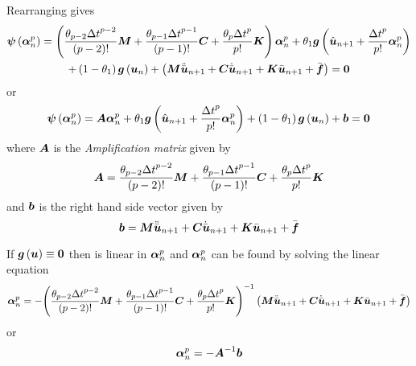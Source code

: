 Rearranging gives
\begin{multline}
  \fnof{\vect{\psi}}{\vect{\alpha}^{p}_{n}}=\pbrac{\dfrac{\theta_{p-2}{\Delta
        t}^{p-2}}{\factorial{p-2}}\matr{M}+\dfrac{\theta_{p-1}{\Delta
        t}^{p-1}}{\factorial{p-1}}\matr{C}+\dfrac{\theta_{p}{\Delta
        t}^{p}}{p!}\matr{K}}\vect{\alpha}^{p}_{n}+\theta_{1}\fnof{\vect{g}}{\hat{\vect{u}}_{n+1}+ 
    \dfrac{{\Delta t}^{p}}{p!}\vect{\alpha}^{p}_{n}} \\
  +\pbrac{1-\theta_{1}}\fnof{\vect{g}}{\vect{u}_{n}}+
  \pbrac{\matr{M}\ddot{\bar{\vect{u}}}_{n+1}+\matr{C}\dot{\bar{\vect{u}}}_{n+1}+\matr{K}\bar{\vect{u}}_{n+1}+
    \bar{\vect{f}}}= \vect{0}
  \label{eqn:dynamic}
\end{multline}
or 
\begin{equation}
\fnof{\vect{\psi}}{\vect{\alpha}^{p}_{n}}=\matr{A}\vect{\alpha}^{p}_{n}+
\theta_{1}\fnof{\vect{g}}{\hat{\vect{u}}_{n+1}+ \dfrac{{\Delta
      t}^{p}}{p!}\vect{\alpha}^{p}_{n}}+\pbrac{1-\theta_{1}}\fnof{\vect{g}}{\vect{u}_{n}}+\vect{b}= \vect{0}
\end{equation}
where $\matr{A}$ is the \emph{Amplification matrix} given by
\begin{equation}
  \matr{A}=\dfrac{\theta_{p-2}{\Delta t}^{p-2}}{\factorial{p-2}}\matr{M}+
  \dfrac{\theta_{p-1}{\Delta t}^{p-1}}{\factorial{p-1}}\matr{C}+
  \dfrac{\theta_{p}{\Delta t}^{p}}{p!}\matr{K}
\end{equation}
and $\vect{b}$ is the right hand side vector given by
\begin{equation}
  \vect{b}=\matr{M}\ddot{\bar{\vect{u}}}_{n+1}+\matr{C}\dot{\bar{\vect{u}}}_{n+1}+
  \matr{K}\bar{\vect{u}}_{n+1}+\bar{\vect{f}}
\end{equation}

If $\fnof{\vect{g}}{\vect{u}}\equiv\vect{0}$ then  is linear in
$\vect{\alpha}^{p}_{n}$ and $\vect{\alpha}^{p}_{n}$ can be found by solving
the linear equation
\begin{equation}
  \vect{\alpha}^{p}_{n} =-\inverse{\pbrac{\dfrac{\theta_{p-2}{\Delta t}^{p-2}}{\factorial{p-2}}\matr{M}+
      \dfrac{\theta_{p-1}{\Delta t}^{p-1}}{\factorial{p-1}}\matr{C}+
      \dfrac{\theta_{p}{\Delta
          t}^{p}}{p!}\matr{K}}}\pbrac{\matr{M}\ddot{\bar{\vect{u}}}_{n+1}+
    \matr{C}\dot{\bar{\vect{u}}}_{n+1}+\matr{K}\bar{\vect{u}}_{n+1}+\bar{\vect{f}}}
\end{equation}
or 
\begin{equation}
  \vect{\alpha}^{p}_{n} =-\inverse{\matr{A}}\vect{b}
\end{equation}


